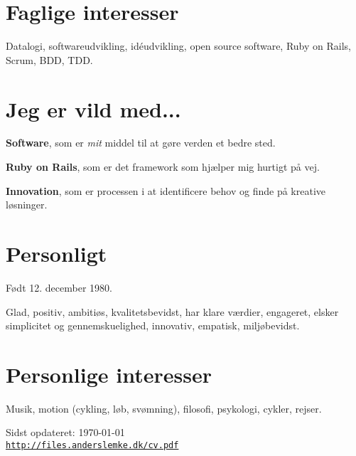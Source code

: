 \documentclass[a4paper]{article}
\renewenvironment{itemize}{
  \begin{list}{}
    { \setlength{\itemsep}{5pt}
      \setlength{\parsep}{0pt}
      \setlength{\topsep}{0pt}
      \setlength{\leftmargin}{0em} } }{
  \end{list}}
\begin{document}
\section*{Faglige interesser}

Datalogi, softwareudvikling, idéudvikling, open source software, Ruby on Rails, Scrum, BDD, TDD.

\section*{Jeg er vild med...}

\begin{itemize}
  \item \textbf{Software}, som er \emph{mit} middel til at gøre verden et bedre sted.
  \item \textbf{Ruby on Rails}, som er det framework som hjælper mig hurtigt på vej.
  \item \textbf{Innovation}, som er processen i at identificere behov og finde på kreative løsninger.
\end{itemize}

\section*{Personligt}
Født 12. december 1980.

Glad, positiv, ambitiøs, kvalitetsbevidst, har klare værdier, engageret, elsker simplicitet og gennemskuelighed, innovativ, empatisk, miljøbevidst.


\section*{Personlige interesser} 

Musik, motion (cykling, løb, svømning), filosofi, psykologi, cykler, rejser.

\bigskip

\begin{center}
\begin{footnotesize}
Sidst opdateret: \today \\
\href{http://files.anderslemke.dk/cv.pdf}{\tt http://files.anderslemke.dk/cv.pdf}
\end{footnotesize}
\end{center}
\end{document}
